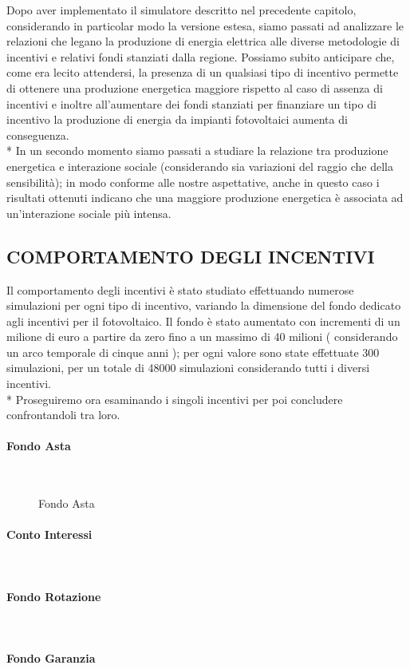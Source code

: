 \documentclass[12pt,a4paper,openright,twoside]{report}
\newcommand{\myparagraph}[1]{\paragraph{#1}\mbox{}\\}
\begin{document}
Dopo aver implementato il simulatore descritto nel precedente capitolo, considerando in particolar modo la versione estesa, siamo passati ad analizzare le relazioni che legano la produzione di energia elettrica alle diverse metodologie di incentivi e relativi fondi stanziati dalla regione. Possiamo subito anticipare che, come era lecito attendersi, la presenza di un qualsiasi tipo di incentivo permette di ottenere una produzione energetica maggiore rispetto al caso di assenza di incentivi e inoltre all'aumentare dei fondi stanziati per finanziare un tipo di incentivo la produzione di energia da impianti fotovoltaici aumenta di conseguenza.\\*
In un secondo momento siamo passati a studiare la relazione tra produzione energetica e interazione sociale (considerando sia variazioni del raggio che della sensibilità); in modo conforme alle nostre aspettative, anche in questo caso i risultati ottenuti indicano che una maggiore produzione energetica è associata ad un'interazione sociale più intensa.


\subsection{COMPORTAMENTO DEGLI INCENTIVI}

Il comportamento degli incentivi è stato studiato effettuando numerose simulazioni per ogni tipo di incentivo, variando la dimensione del fondo dedicato agli incentivi per il fotovoltaico. Il fondo è stato aumentato con incrementi di un milione di euro a partire da zero  fino a un massimo di 40 milioni ( considerando un arco temporale di cinque anni ); per ogni valore sono state effettuate 300 simulazioni, per un totale di 48000 simulazioni considerando tutti i diversi incentivi.\\*
Proseguiremo ora esaminando i singoli incentivi per poi concludere confrontandoli tra loro.

\myparagraph{Fondo Asta}

\begin{figure}[H]
	\centering
	\qquad
	\caption{Fondo Asta}
	\label{graphSimA}
\end{figure}


\myparagraph{Conto Interessi}

\myparagraph{Fondo Rotazione}

\myparagraph{Fondo Garanzia}
\end{document}
